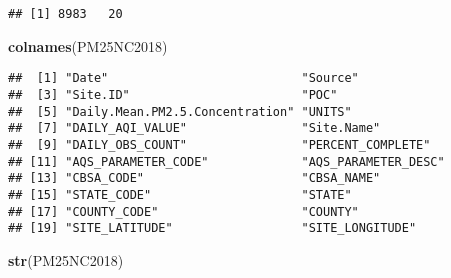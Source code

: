 \documentclass[]{article}
\newenvironment{Shaded}{\begin{snugshade}}{\end{snugshade}}
\newcommand{\KeywordTok}[1]{\textcolor[rgb]{0.13,0.29,0.53}{\textbf{#1}}}
\newcommand{\NormalTok}[1]{#1}
\begin{document}
\begin{verbatim}
## [1] 8983   20
\end{verbatim}

\begin{Shaded}
\begin{Highlighting}[]
\KeywordTok{colnames}\NormalTok{(PM25NC2018)}
\end{Highlighting}
\end{Shaded}

\begin{verbatim}
##  [1] "Date"                           "Source"                        
##  [3] "Site.ID"                        "POC"                           
##  [5] "Daily.Mean.PM2.5.Concentration" "UNITS"                         
##  [7] "DAILY_AQI_VALUE"                "Site.Name"                     
##  [9] "DAILY_OBS_COUNT"                "PERCENT_COMPLETE"              
## [11] "AQS_PARAMETER_CODE"             "AQS_PARAMETER_DESC"            
## [13] "CBSA_CODE"                      "CBSA_NAME"                     
## [15] "STATE_CODE"                     "STATE"                         
## [17] "COUNTY_CODE"                    "COUNTY"                        
## [19] "SITE_LATITUDE"                  "SITE_LONGITUDE"
\end{verbatim}

\begin{Shaded}
\begin{Highlighting}[]
\KeywordTok{str}\NormalTok{(PM25NC2018)}
\end{Highlighting}
\end{Shaded}
\end{document}
